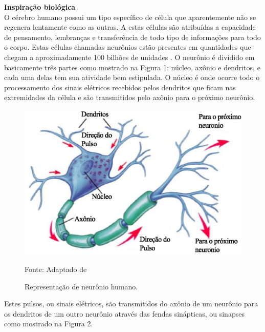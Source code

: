 \noindent
\textbf{Inspiração biológica} \\

    O cérebro humano possui um tipo específico de célula que aparentemente não se regenera lentamente como as outras. A estas células são atribuídas a capacidade de pensamento, lembranças e transferência de todo tipo de informações para todo o corpo. Estas células chamadas neurônios estão presentes em quantidades que chegam a aproximadamente 100 bilhões de unidades \cite{anderson1992artificial}.
    O neurônio é dividido em basicamente três partes como mostrado na Figura 1: núcleo, axônio e dendritos, e cada uma delas tem sua atividade bem estipulada. O núcleo é onde ocorre todo o processamento dos sinais elétricos recebidos pelos dendritos que ficam nas extremidades da célula e são transmitidos pelo axônio para o próximo neurônio.

    \begin{figure}[ht]
        \centering
        \label{fig01}
            \includegraphics[keepaspectratio=true, scale=0.4]{editaveis/images/neuronio.eps}
        \caption{Representação de neurônio humano.}
        Fonte: Adaptado de \cite{marieb2009}
    \end{figure}

    Estes pulsos, ou sinais elétricos, são transmitidos do axônio de um neurônio para os dendritos de um outro neurônio através das fendas sinápticas, ou sinapses como mostrado na Figura 2.


